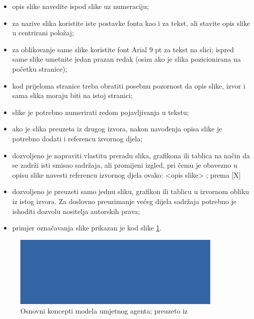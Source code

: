 \documentclass[]{foi}
\begin{document}
\begin{itemize}
    \item opis slike navedite ispod slike uz numeraciju;
    
    \item za nazive slika koristite iste postavke fonta kao i za tekst, ali stavite opis slike u centrirani položaj;

    \item za oblikovanje same slike koristite font Arial 9 pt za tekst na slici;
ispred same slike umetnite jedan prazan redak (osim ako je slika pozicionirana na početku stranice);

    \item kod prijeloma stranice treba obratiti posebnu pozornost da opis slike, izvor i sama slika moraju biti na istoj stranici; 

    \item slike je potrebno numerirati redom pojavljivanja u tekstu;

    \item ako je slika preuzeta iz drugog izvora, nakon navođenja opisa slike je potrebno dodati i referencu izvornog djela;

    \item dozvoljeno je napraviti vlastitu preradu slika, grafikona ili tablica na način da se zadrži isti smisao sadržaja, ali promijeni izgled, pri čemu je obavezno u opisu slike navesti referencu izvornog djela ovako: <opis slike> ; prema [X]

    \item dozvoljeno je preuzeti samo jednu sliku, grafikon ili tablicu u izvornom obliku iz istog izvora. Za doslovno preuzimanje većeg dijela sadržaja potrebno je ishoditi dozvolu nositelja autorskih prava;

    \item primjer označavanja slike prikazan je kod slike \ref{fig:podjela}.
\end{itemize}

\begin{figure}[]
    \centering
    \includegraphics[width=0.9\textwidth]{slike/slika.png}
    \caption{Osnovni koncepti modela umjetnog agenta; preuzeto iz \cite{russell2022ArtificialIntelligenceModern}}
    \label{fig:podjela}
\end{figure}
\end{document}
